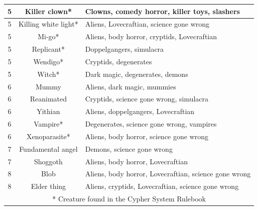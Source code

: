 \begin{longtable}{|c|c|X|}
5 & Killer clown* & Clowns, comedy horror, killer toys, slashers \\ \hline
5 & Killing white light* & Aliens, Lovecraftian, science gone wrong \\ \hline
5 & Mi-go* & Aliens, body horror, cryptids, Lovecraftian \\ \hline
5 & Replicant* & Doppelgangers, simulacra \\ \hline
5 & Wendigo* & Cryptids, degenerates \\ \hline
5 & Witch* & Dark magic, degenerates, demons \\ \hline
6 & Mummy & Aliens, dark magic, mummies \\ \hline
6 & Reanimated & Cryptids, science gone wrong, simulacra \\ \hline
6 & Yithian & Aliens, doppelgangers, Lovecraftian \\ \hline
6 & Vampire* & Degenerates, science gone wrong, vampires \\ \hline
6 & Xenoparasite* & Aliens, body horror, science gone wrong \\ \hline
7 & Fundamental angel & Demons, science gone wrong \\ \hline
7 & Shoggoth & Aliens, body horror, Lovecraftian \\ \hline
8 & Blob & Aliens, body horror, Lovecraftian, science gone wrong \\ \hline
8 & Elder thing & Aliens, cryptids, Lovecraftian, science gone wrong \\ \hline
\multicolumn{3}{|c|}{* Creature found in the Cypher System Rulebook}
\end{longtable}
